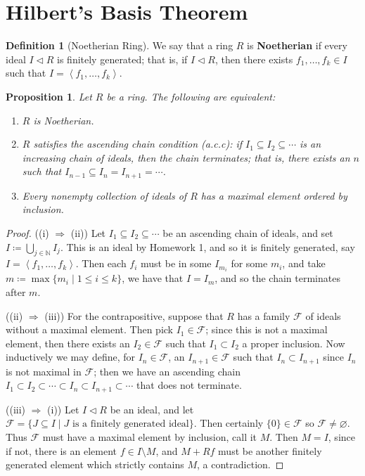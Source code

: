 \documentclass[letterpaper]{article}
\newtheorem{proposition}[theorem]{Proposition}
\theoremstyle{definition}
\newtheorem{definition}[theorem]{Definition}
\theoremstyle{remark}
\newcommand\NN{\mathbb{N}}
\newcommand{\defeq}{\coloneqq}
\newcommand{\ideal}{\vartriangleleft}
\newcommand{\abrackets}[1]{\left\langle#1\right\rangle}
\begin{document}
\section{Hilbert's Basis Theorem}
\begin{definition}[Noetherian Ring]
    We say that a ring $R$ is \textbf{Noetherian} if every ideal $I\ideal R$ is finitely generated; that is, if $I\ideal R$, then there exists $f_1,\dots, f_k\in I$ such that $I=\abrackets{f_1,\dots,f_k}$.
\end{definition}
\begin{proposition}
    Let $R$ be a ring. The following are equivalent: 
    \begin{enumerate}[label=(\roman*)]
        \item $R$ is Noetherian. 
        \item $R$ satisfies the ascending chain condition (a.c.c): if $I_1\subseteq I_2\subseteq \cdots$ is an increasing chain of ideals, then the chain terminates; that is, there exists an $n$ such that $I_{n-1}\subseteq I_n=I_{n+1}=\cdots$.
        \item Every nonempty collection of ideals of $R$ has a maximal element ordered by inclusion. 
    \end{enumerate}
\end{proposition}
\begin{proof}
    ((i) $\Rightarrow$ (ii)) Let $I_1\subseteq I_2\subseteq\cdots$ be an ascending chain of ideals, and set $I\defeq \bigcup_{j\in\NN} I_j$. This is an ideal by Homework 1, and so it is finitely generated, say $I=\abrackets{f_1,\dots,f_k}$. Then each $f_i$ must be in some $I_{m_i}$ for some $m_i$, and take $m\defeq \max\{m_i\mid 1\le i\le k\}$, we have that $I=I_m$, and so the chain terminates after $m$. 
    
    ((ii) $\Rightarrow$ (iii)) For the contrapositive, suppose that $R$ has a family $\mathcal{F}$ of ideals without a maximal element. Then pick $I_1\in \mathcal{F}$; since this is not a maximal element, then there exists an $I_2\in\mathcal{F}$ such that $I_1\subset I_2$ a proper inclusion. Now inductively we may define, for $I_n\in\mathcal{F}$, an $I_{n+1}\in \mathcal{F}$ such that $I_n\subset I_{n+1}$ since $I_n$ is not maximal in $\mathcal{F}$; then we have an ascending chain $I_1\subset I_2\subset \cdots \subset I_n\subset I_{n+1}\subset \cdots$ that does not terminate. 
    
    ((iii) $\Rightarrow$ (i)) Let $I\ideal R$ be an ideal, and let $\mathcal{F}=\{J\subseteq I\mid J\text{ is a finitely generated ideal}\}$. Then certainly $\{0\}\in\mathcal{F}$ so $\mathcal{F}\ne\varnothing$. Thus $\mathcal{F}$ must have a maximal element by inclusion, call it $M$. Then $M=I$, since if not, there is an element $f\in I\setminus M$, and $M+Rf$ must be another finitely generated element which strictly contains $M$, a contradiction. 
\end{proof}
\end{document}
